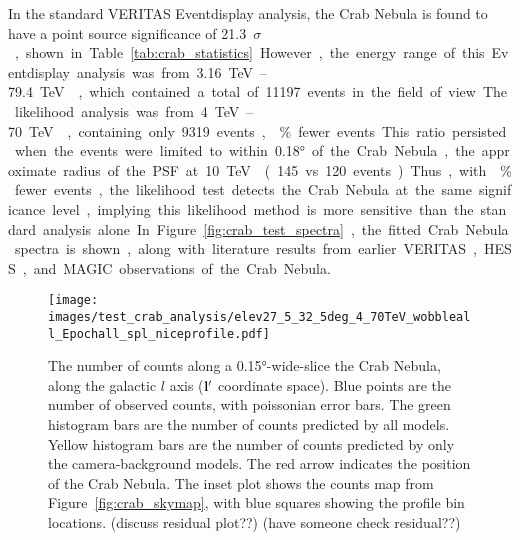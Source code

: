   In the standard VERITAS Eventdisplay analysis, the Crab Nebula is found to have a point source significance of \SI{21.3}{$\sigma$}, shown in Table~\ref{tab:crab_statistics}.
  However, the energy range of this Eventdisplay analysis was from \SIrange{3.16}{79.4}{\TeV{}}, which contained a total of 11197 events in the field of view.
  The likelihood analysis was from \SIrange{4}{70}{\TeV{}}, containing only 9319 events, \% fewer events.
  This ratio persisted when the events were limited to within \ang{0.18} of the Crab Nebula, the approximate radius of the PSF at \SI{10}{\TeV{}} (145 vs 120 events).
  Thus, with \% fewer events, the likelihood test detects the Crab Nebula at the same significance level, implying this likelihood method is more sensitive than the standard analysis alone.
  In Figure~\ref{fig:crab_test_spectra}, the fitted Crab Nebula spectra is shown, along with literature results from earlier VERITAS, HESS, and MAGIC observations of the Crab Nebula.
  
  \begin{figure}[!t]
    \centering
    \texttt{[image: images/test\_crab\_analysis/elev27\_5\_32\_5deg\_4\_70TeV\_wobbleall\_Epochall\_spl\_niceprofile.pdf]}
    \caption[Crab Nebula Profile along Galactic $l$]
    {
      The number of counts along a \ang{0.15}-wide-slice the Crab Nebula, along the galactic $l$ axis ($\mathbf{l'}$ coordinate space).
      Blue points are the number of observed counts, with poissonian error bars.
      The green histogram bars are the number of counts predicted by all models.
      Yellow histogram bars are the number of counts predicted by only the camera-background models.
      The red arrow indicates the position of the Crab Nebula.
      The inset plot shows the counts map from Figure~\ref{fig:crab_skymap}, with blue squares showing the profile bin locations.
      {\color{red}(discuss residual plot??)}
      {\color{red}(have someone check residual??)}
    }
    \label{fig:crab_profile_l}
  \end{figure}

